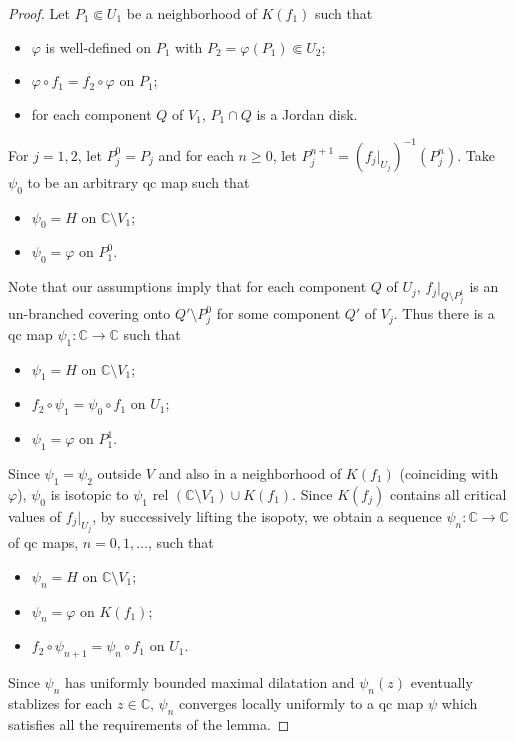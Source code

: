 \documentclass{amsart}
\numberwithin{equation}{section}
\newcommand{\C}{\mathbb C}
\theoremstyle{definition}
\theoremstyle{remark}
\begin{document}
\begin{proof} Let $P_1\Subset U_1$ be a neighborhood of $K(f_1)$ such that 
\begin{itemize}
\item $\varphi$ is well-defined on $P_1$ with $P_2=\varphi(P_1)\Subset U_2$;
\item $\varphi\circ f_1=f_2\circ \varphi$ on $P_1$;
\item for each component $Q$ of $V_1$, $P_1\cap Q$ is a Jordan disk. 
\end{itemize}
For $j=1,2$, let $P_j^0=P_j$ and for each $n\ge 0$, let $P_j^{n+1}=(f_j|_{U_j})^{-1}(P_j^n)$. Take $\psi_0$ to be an arbitrary qc map such that 
\begin{itemize}
\item $\psi_0=H$ on $\C\setminus V_1$;
\item $\psi_0=\varphi$ on $P_1^0$. 
\end{itemize}
Note that our assumptions imply that for each component $Q$ of $U_j$, $f_j|_{Q\setminus P_j^1}$ is an un-branched covering onto $Q'\setminus P_j^0$ for some component $Q'$ of $V_j$. Thus there is a qc map $\psi_1:\C\to \C$ such that 
\begin{itemize}
\item $\psi_1=H$ on $\C\setminus V_1$;
\item $f_2\circ \psi_1=\psi_0\circ f_1$ on $U_1$;
\item $\psi_1=\varphi$ on $P_1^1$. 
\end{itemize}
Since $\psi_1=\psi_2$ outside $V$ and also in a neighborhood of $K(f_1)$ (coinciding with $\varphi$),  $\psi_0$ is isotopic to $\psi_1$ rel $(\C\setminus V_1)\cup K(f_1)$.
Since $K(f_j)$ contains all critical values of $f_j|_{U_j}$, by successively lifting the isopoty, we obtain a sequence $\psi_n:\C\to \C$ of qc maps, $n=0,1,\ldots$, such that 
\begin{itemize}
\item[(i)] $\psi_n=H$ on $\C\setminus V_1$;
\item[(ii)] $\psi_n=\varphi$ on $K(f_1)$;
\item[(iii)] $f_2\circ\psi_{n+1}=\psi_n\circ f_1$ on $U_1$. 
\end{itemize}
Since $\psi_n$ has uniformly bounded maximal dilatation and $\psi_n(z)$ eventually stablizes for each $z\in\C$, $\psi_n$ converges locally uniformly to a qc map $\psi$ which satisfies all the requirements of the lemma.  
\end{proof}
\end{document}

